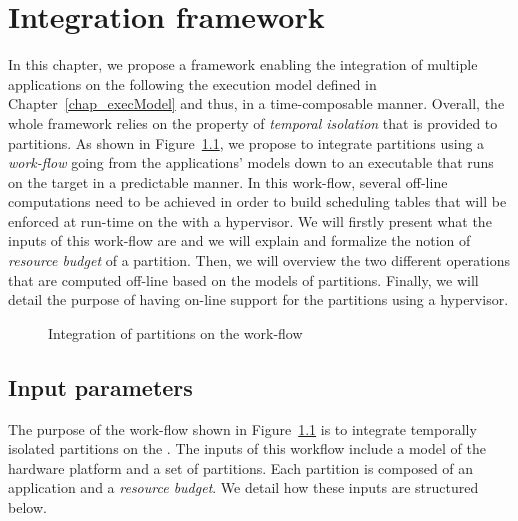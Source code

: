 \documentclass[main.tex]{subfiles}
\begin{document}
\chapter{Integration framework}
\thispagestyle{chapstyle}
\label{chap_framework}
\minitoc

In this chapter, we propose a framework enabling the integration of multiple
applications on the \mppalong following the execution model defined in
Chapter~\ref{chap_execModel} and thus, in a time-composable manner. Overall,
the whole framework relies on the property of \emph{temporal isolation} that is
provided to partitions. As shown in Figure~\ref{fig_framework_workFlow}, we
propose to integrate partitions using a \emph{work-flow} going from the
applications' models down to an executable that runs on the target in a
predictable manner. In this work-flow, several off-line computations need to be
achieved in order to build scheduling tables that will be enforced at run-time
on the \mppalong with a hypervisor.  We will firstly present what the inputs of
this work-flow are and we will explain and formalize the notion of
\emph{resource budget} of a partition. Then, we will overview the two different
operations that are computed off-line based on the models of partitions.
Finally, we will detail the purpose of having on-line support for the
partitions using a hypervisor. 

\begin{figure}
    \centering
    \scalebox{0.9}{}
    \caption{Integration of partitions on the \mppalong work-flow}
    \label{fig_framework_workFlow}
\end{figure}


\section{Input parameters}
The purpose of the work-flow shown in Figure~\ref{fig_framework_workFlow} is to
integrate temporally isolated partitions on the \mppalong. The inputs of this
workflow include a model of the hardware platform and a set of partitions. Each
partition is composed of an application and a \emph{resource budget}. We detail
how these inputs are structured below. 
\end{document}
